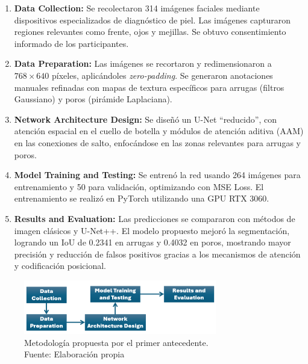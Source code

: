 \begin{enumerate}[label=\textbf{\arabic*.}, leftmargin=2em]
    \item \textbf{Data Collection:} Se recolectaron 314 imágenes faciales mediante dispositivos especializados de diagnóstico de piel. Las imágenes capturaron regiones relevantes como frente, ojos y mejillas. Se obtuvo consentimiento informado de los participantes.
    \item \textbf{Data Preparation:} Las imágenes se recortaron y redimensionaron a $768 \times 640$ píxeles, aplicándoles \textit{zero-padding}. Se generaron anotaciones manuales refinadas con mapas de textura específicos para arrugas (filtros Gaussiano) y poros (pirámide Laplaciana).
    \item \textbf{Network Architecture Design:} Se diseñó un U-Net “reducido”, con atención espacial en el cuello de botella y módulos de atención aditiva (AAM) en las conexiones de salto, enfocándose en las zonas relevantes para arrugas y poros.
    \item \textbf{Model Training and Testing:} Se entrenó la red usando 264 imágenes para entrenamiento y 50 para validación, optimizando con MSE Loss. El entrenamiento se realizó en PyTorch utilizando una GPU RTX 3060.
    \item \textbf{Results and Evaluation:} Las predicciones se compararon con métodos de imagen clásicos y U-Net++. El modelo propuesto mejoró la segmentación, logrando un IoU de 0.2341 en arrugas y 0.4032 en poros, mostrando mayor precisión y reducción de falsos positivos gracias a los mecanismos de atención y codificación posicional.
\end{enumerate}

\begin{figure}[H]
	\begin{center}
		\includegraphics[width=0.75\textwidth]{2/figures/metoant1.png}
		\caption[Metodología propuesta por el primer antecedente]{Metodología propuesta por el primer antecedente.\\
			Fuente: Elaboración propia}
		\label{2:figant1}
	\end{center}
\end{figure}

